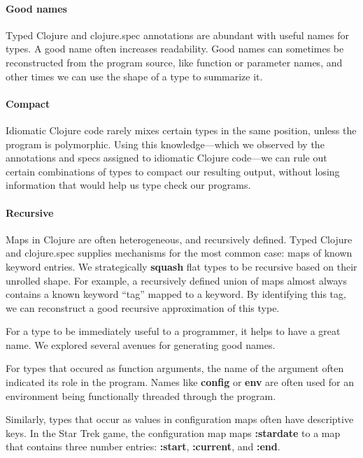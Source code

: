 \paragraph{Good names}
Typed Clojure and clojure.spec annotations are abundant
with useful names for types. A good name often increases
readability.
Good names can sometimes be reconstructed from the program source,
like function or parameter names, and other times 
we can use the shape of a type to summarize it.

\paragraph{Compact}
Idiomatic Clojure code rarely mixes certain types in the same position,
unless the program is polymorphic. Using this knowledge---which we observed
by the annotations and specs assigned to idiomatic Clojure 
code---we can rule out certain combinations of types to compact our
resulting output, without losing information that would help us
type check our programs.

\paragraph{Recursive}
Maps in Clojure are often heterogeneous, and recursively defined.
Typed Clojure and clojure.spec supplies mechanisms for the most
common case: maps of known keyword entries.
We strategically \textbf{squash} flat types to be recursive
based on their unrolled shape.
For example, a recursively defined union of maps almost always
contains a known keyword ``tag'' mapped to a keyword.
By identifying this tag, we can reconstruct a good recursive
approximation of this type.


For a type to be immediately useful to a programmer, it helps
to have a great name. We explored several avenues for
generating good names.

For types that occured as function arguments, the name of
the argument often indicated its role in the program.
Names like \textbf{config} or \textbf{env} are often used
for an environment being functionally threaded through
the program.

Similarly, types that occur as values in configuration
maps often have descriptive keys. In the Star Trek 
game, the configuration map maps \textbf{:stardate}
to a map that contains three number entries: 
\textbf{:start},
\textbf{:current}, and
\textbf{:end}.

